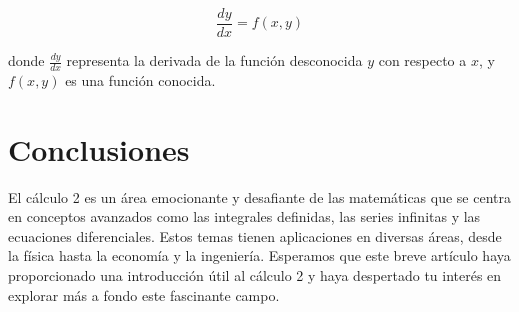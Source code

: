\documentclass{article}
\begin{document}
\begin{equation}
\frac{dy}{dx} = f(x, y)
\end{equation}

donde $\frac{dy}{dx}$ representa la derivada de la función desconocida $y$ con respecto a $x$, y $f(x, y)$ es una función conocida.

\section{Conclusiones}
El cálculo 2 es un área emocionante y desafiante de las matemáticas que se centra en conceptos avanzados como las integrales definidas, las series infinitas y las ecuaciones diferenciales. Estos temas tienen aplicaciones en diversas áreas, desde la física hasta la economía y la ingeniería. Esperamos que este breve artículo haya proporcionado una introducción útil al cálculo 2 y haya despertado tu interés en explorar más a fondo este fascinante campo.
\end{document}
